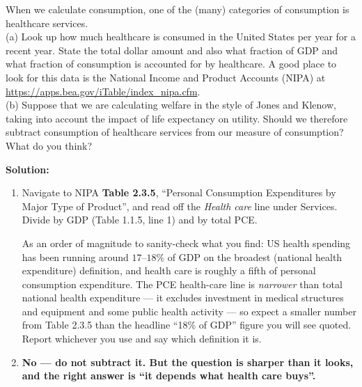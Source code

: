 \documentclass[12pt, letterpaper]{article}
\begin{document}
\begin{tcolorbox}[oddbox,title={Problem 2.3 \quad Healthcare}]
\begin{tcolorbox}[questionbox]
When we calculate consumption, one of the (many) categories of consumption is healthcare
services.\\[3pt]
(a) Look up how much healthcare is consumed in the United States per year for a recent year.
State the total dollar amount and also what fraction of GDP and what fraction of consumption
is accounted for by healthcare. A good place to look for this data is the National Income and
Product Accounts (NIPA) at \url{https://apps.bea.gov/iTable/index_nipa.cfm}.\\
(b) Suppose that we are calculating welfare in the style of Jones and Klenow, taking into
account the impact of life expectancy on utility. Should we therefore subtract consumption of
healthcare services from our measure of consumption? What do you think?
\end{tcolorbox}

\textbf{Solution:}

\begin{enumerate}

\item \begin{tcolorbox}[databox,title={Look this up yourself --- NIPA Table 2.3.5}]
Navigate to NIPA \textbf{Table 2.3.5}, ``Personal Consumption Expenditures by Major Type of
Product'', and read off the \emph{Health care} line under Services. Divide by GDP
(Table 1.1.5, line 1) and by total PCE.

As an order of magnitude to sanity-check what you find: US health spending has been running
around $17$--$18\%$ of GDP on the broadest (national health expenditure) definition, and
health care is roughly a fifth of personal consumption expenditure. The PCE health-care line
is \emph{narrower} than total national health expenditure --- it excludes investment in
medical structures and equipment and some public health activity --- so expect a smaller
number from Table 2.3.5 than the headline ``18\% of GDP'' figure you will see quoted. Report
whichever you use and say which definition it is.
\end{tcolorbox}

\item \textbf{No --- do not subtract it. But the question is sharper than it looks, and the
right answer is ``it depends what health care buys''.}


\end{enumerate}
\end{tcolorbox}
\end{document}
